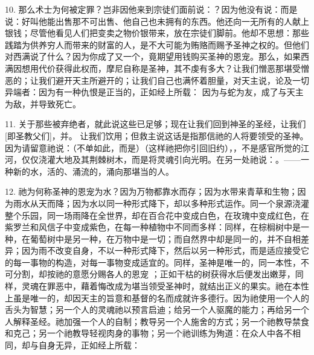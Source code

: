 10. 那么术士为何被定罪？岂非因他来到宗徒们面前说：？因为他没有说：而是说：好叫他能出售那不可出售、他自己也未拥有的东西。他还向一无所有的人献上银钱；尽管他看见人们把变卖之物价银带来，放在宗徒们脚前。他却不思想：那些践踏为供养穷人而带来的财富的人，是不大可能为贿赂而赐予圣神之权的。但他们对西满说了什么？因为你成了又一个，竟期望用钱购买圣神的恩宠。那么，如果西满因想用代价获得此权而，摩尼自称是圣神，其不虔有多大？让我们憎恶那堪受憎恶的；让我们避开天主所避开的；让我们自己也满怀着胆量，对天主说，论及一切异端者：因为有一种仇恨是正当的，正如经上所载： 因为与蛇为友，成了与天主为敌，并导致死亡。\par

11. 关于那些被弃绝者，就此说这些已足够；现在让我们回到神圣的圣经，让我们[即圣教父们]，并。 让我们饮用；但救主说这话是指那信祂的人将要领受的圣神。因为请留意祂说：（不单如此，而是）（这样祂把你引回旧约），，不是感官所觉的江河，仅仅浇灌大地及其荆棘树木，而是将灵魂引向光明。在另一处祂说：。——一种新的水，活的、涌流的，涌向那堪当的人。\par

12. 祂为何称圣神的恩宠为水？因为万物都靠水而存；因为水带来青草和生物；因为雨水从天而降；因为水以同一种形式降下，却以多种形式运作。同一个泉源浇灌整个乐园，同一场雨降在全世界，却在百合花中变成白色，在玫瑰中变成红色，在紫罗兰和风信子中变成紫色，在每一种植物中不同而多样：同样，在棕榈树中是一种，在葡萄树中是另一种，在万物中是一切；而自然界中却是同一的，并不自相差异；因为雨不改变自身，不以一种形式降下，然后以另一种形式，而是适应接受它的每一事物的构造，对每一事物变成适宜的。同样，圣神是唯一的，同一本性，不可分割，却按祂的意愿分赐各人的恩宠 ；正如干枯的树获得水后便发出嫩芽，同样，灵魂在罪恶中，藉着悔改成为堪当领受圣神时，就结出正义的果实。祂在本性上虽是唯一的，却因天主的旨意和基督的名而成就许多德行。因为祂使用一个人的舌头为智慧；另一个人的灵魂祂以预言启迪；给另一个人驱魔的能力；再给另一个人解释圣经。祂加强一个人的自制；教导另一个人施舍的方式；另一个祂教导禁食和克己；另一个祂教导轻视肉身的事物；另一个祂训练为殉道：在众人中各不相同，却与自身无异，正如经上所载：\par

